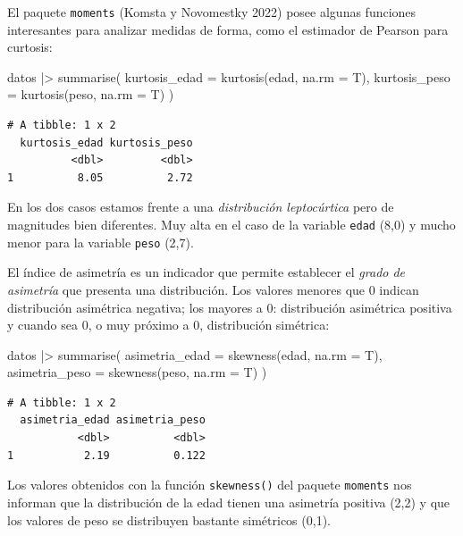 \documentclass[
  spanish,
  a4paper,
]{scrbook}
\newenvironment{Shaded}{\begin{snugshade}}{\end{snugshade}}
\newcommand{\AttributeTok}[1]{\textcolor[rgb]{0.40,0.45,0.13}{#1}}
\newcommand{\FunctionTok}[1]{\textcolor[rgb]{0.28,0.35,0.67}{#1}}
\newcommand{\NormalTok}[1]{\textcolor[rgb]{0.00,0.23,0.31}{#1}}
\newcommand{\SpecialCharTok}[1]{\textcolor[rgb]{0.37,0.37,0.37}{#1}}
\begin{document}
El paquete \texttt{moments} (Komsta y Novomestky 2022) posee algunas
funciones interesantes para analizar medidas de forma, como el estimador
de Pearson para curtosis:

\begin{Shaded}
\begin{Highlighting}[]
\NormalTok{datos }\SpecialCharTok{|\textgreater{}}
  \FunctionTok{summarise}\NormalTok{(}
    \AttributeTok{kurtosis\_edad =} \FunctionTok{kurtosis}\NormalTok{(edad, }\AttributeTok{na.rm =}\NormalTok{ T),}
    \AttributeTok{kurtosis\_peso =} \FunctionTok{kurtosis}\NormalTok{(peso, }\AttributeTok{na.rm =}\NormalTok{ T)}
\NormalTok{  )}
\end{Highlighting}
\end{Shaded}

\begin{verbatim}
# A tibble: 1 x 2
  kurtosis_edad kurtosis_peso
          <dbl>         <dbl>
1          8.05          2.72
\end{verbatim}

En los dos casos estamos frente a una \emph{distribución leptocúrtica}
pero de magnitudes bien diferentes. Muy alta en el caso de la variable
\texttt{edad} (8,0) y mucho menor para la variable \texttt{peso} (2,7).

El índice de asimetría es un indicador que permite establecer el
\emph{grado de asimetría} que presenta una distribución. Los valores
menores que 0 indican distribución asimétrica negativa; los mayores a 0:
distribución asimétrica positiva y cuando sea 0, o muy próximo a 0,
distribución simétrica:

\begin{Shaded}
\begin{Highlighting}[]
\NormalTok{datos }\SpecialCharTok{|\textgreater{}}
  \FunctionTok{summarise}\NormalTok{(}
    \AttributeTok{asimetria\_edad =} \FunctionTok{skewness}\NormalTok{(edad, }\AttributeTok{na.rm =}\NormalTok{ T),}
    \AttributeTok{asimetria\_peso =} \FunctionTok{skewness}\NormalTok{(peso, }\AttributeTok{na.rm =}\NormalTok{ T)}
\NormalTok{  )}
\end{Highlighting}
\end{Shaded}

\begin{verbatim}
# A tibble: 1 x 2
  asimetria_edad asimetria_peso
           <dbl>          <dbl>
1           2.19          0.122
\end{verbatim}

Los valores obtenidos con la función \texttt{skewness()} del paquete
\texttt{moments} nos informan que la distribución de la edad tienen una
asimetría positiva (2,2) y que los valores de peso se distribuyen
bastante simétricos (0,1).
\end{document}
